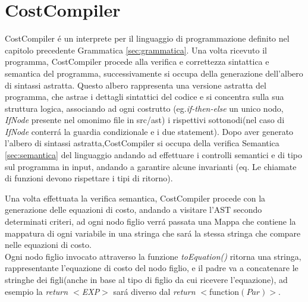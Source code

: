 \documentclass[../../main.tex]{subfiles}
\begin{document}
\chapter{CostCompiler}
CostCompiler é un interprete per il linguaggio di programmazione definito nel capitolo precedente Grammatica \ref{sec:grammatica}. Una volta ricevuto il programma, CostCompiler procede alla verifica e correttezza sintattica e semantica del programma, successivamente si occupa della generazione dell'albero di sintassi astratta. 
Questo albero rappresenta una versione astratta del programma, che astrae i dettagli sintattici del codice e si concentra sulla sua struttura logica, associando ad ogni costrutto (eg.\textit{if-then-else} un unico nodo, \textit{IfNode} presente nel omonimo file in src/ast) i rispettivi sottonodi(nel caso di \textit{IfNode} conterrá la guardia condizionale e i due statement).
Dopo aver generato l'albero di sintassi astratta,CostCompiler si occupa della verifica Semantica \ref{sec:semantica} del linguaggio andando ad effettuare i controlli semantici e di tipo sul programma in input, andando a garantire alcune invarianti (eq. Le chiamate di funzioni devono rispettare i tipi di ritorno).

Una volta effettuata la verifica semantica, CostCompiler procede con la generazione delle equazioni di costo, andando a visitare l'AST secondo determinati criteri, ad ogni nodo figlio verrá passata una Mappa che contiene la mappatura di ogni variabile in una stringa che sará la stessa stringa che compare nelle equazioni di costo.\\
Ogni nodo figlio invocato attraverso la funzione \textit{toEquation()} ritorna una stringa, rappresentante l'equazione di costo del nodo figlio, e il padre va a concatenare le stringhe dei figli(anche in base al tipo di figlio da cui ricevere l'equazione), ad esempio la \textit{return $<$EXP$>$ } sará diverso dal \textit{return }$<$function$(Par)>$.
\end{document}
